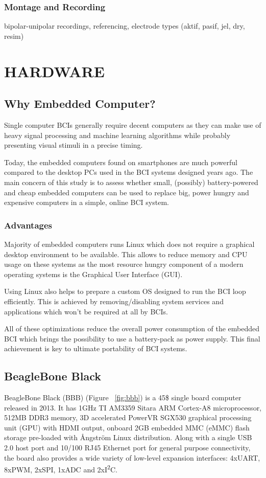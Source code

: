 \documentclass[12pt]{article}
\newcommand\mysection[1]{\vspace*{-0.35cm}\section{#1}\vspace*{6pt}\thispagestyle{empty}}
\newcommand\mysubsection[1]{\subsection{#1}}
\newcommand\mysubsubsection[1]{\subsubsection{#1}}
\numberwithin{equation}{section}
\numberwithin{figure}{section}
\numberwithin{table}{section}
\begin{document}
\mysubsubsection{Montage and Recording}\label{seq:eeg_recording}
\par{
bipolar-unipolar recordings, referencing, 
electrode types (aktif, pasif, jel, dry, resim)
}

\clearpage
\vspace*{-0.35cm}
\mysection{HARDWARE}\label{seq:hardware}

\mysubsection{Why Embedded Computer?}\label{seq:embeddedcomputer}

\par{
Single computer BCIs generally require decent computers as they can make use of heavy signal processing 
and machine learning algorithms while probably presenting visual stimuli in a precise timing.
}

\par{
Today, the embedded computers found on smartphones are much powerful compared to the desktop PCs 
used in the BCI systems designed years ago. The main concern of this study is to assess whether small, 
(possibly) battery-powered and cheap embedded computers can be used to replace big, power hungry and 
expensive computers in a simple, online BCI system.
}

\mysubsubsection{Advantages}\label{seq:embeddedcomputer_advantages}

\par{
Majority of embedded computers runs Linux which does not require a graphical desktop environment 
to be available. This allows to reduce memory and CPU usage on these systems as the most resource 
hungry component of a modern operating systems is the Graphical User Interface (GUI).
}

\par{
Using Linux also helps to prepare a custom OS designed to run the BCI loop efficiently. 
This is achieved by removing/disabling system services and applications which won't be required at all by BCIs.
}

\par{
All of these optimizations reduce the overall power consumption of the embedded BCI which brings 
the possibility to use a battery-pack as power supply. This final achievement is key to ultimate 
portability of BCI systems.
}

\mysubsection{BeagleBone Black}\label{seq:embeddedcomputer_bbb}

\par{
BeagleBone Black (BBB) (Figure ~\ref{fig:bbb}) is a 45\$ single board computer released in 2013. It has 1GHz TI AM3359 Sitara ARM Cortex-A8 microprocessor, 
512MB DDR3 memory, 3D accelerated PowerVR SGX530 graphical processing unit (GPU) with HDMI output, onboard 2GB embedded MMC (eMMC) 
flash storage pre-loaded with Ångström Linux distribution. Along with a single USB 2.0 host port and 10/100 RJ45 Ethernet port for general purpose connectivity, the board also provides a wide variety of low-level expansion interfaces: 
4xUART, 8xPWM, 2xSPI, 1xADC and 2xI\textsuperscript{2}C.
}
\end{document}
